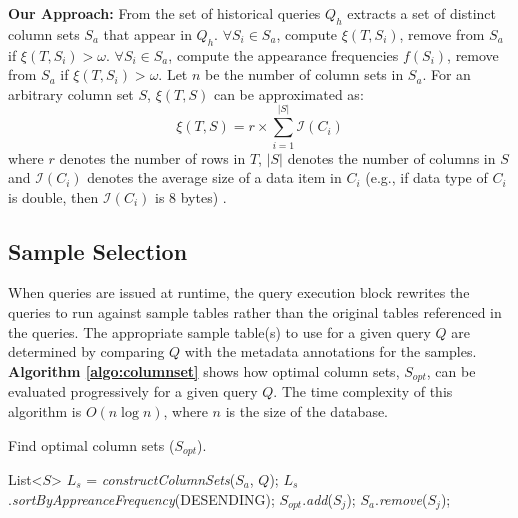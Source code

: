 \documentclass{sig-alternate-05-2015}
\begin{document}
\noindent
\textbf{Our Approach:}
From the set of historical queries $Q_h$ extracts a set of distinct column sets $S_{a}$ that appear in $Q_h$.
$\forall S_i \in S_{a}$, compute $\xi(T, S_i)$, remove from $S_{a}$ if $\xi(T, S_i) > \omega$.
$\forall S_i \in S_{a}$, compute the appearance frequencies $f(S_i)$, remove from $S_{a}$ if $\xi(T, S_i) > \omega$.
Let $n$ be the number of column sets in $S_a$.
For an arbitrary column set $S$, $\xi(T, S)$ can be approximated as:
\begin{equation}
\xi(T, S) = r \times \sum_{i=1}^{|S|} \mathcal{I}(C_i)
\end{equation}
where $r$ denotes the number of rows in $T$, 
$|S|$ denotes the number of columns in $S$ 
and $\mathcal{I}(C_i)$ denotes the average size of a data item in $C_i$ 
(e.g., if data type of $C_i$ is double, then $\mathcal{I}(C_i)$ is 8 bytes) .
\subsection{Sample Selection}
When queries are issued at runtime, the query execution block rewrites the queries to run against sample tables rather than the original tables referenced in the queries.
The appropriate sample table(s) to use for a given query $Q$ are determined by comparing $Q$ with the metadata annotations for the samples.  \textbf{Algorithm \ref{algo:columnset}} shows how optimal column sets, $S_{opt}$, can be evaluated progressively for a given query $Q$. The time complexity of this algorithm is $O (n \log n)$, where $n$ is the size of the database.
\begin{algorithm}
\caption{Find optimal column sets ($S_{opt}$).}
\label{algo:columnset}
\begin{algorithmic}[1]
	\State List<$S$> $L_{s}$ = \textit{constructColumnSets}($S_a$, $Q$);
	\State $L_{s}$.\textit{sortByAppreanceFrequency}(DESENDING);
	\Return
	\Else 	
	\State $S_{opt}$.\textit{add}($S_j$); 
	\State $S_a$.\textit{remove}($S_j$); 
	\EndIf
	\EndFor
	\EndProcedure
\end{algorithmic}
\end{algorithm}
\end{document}
